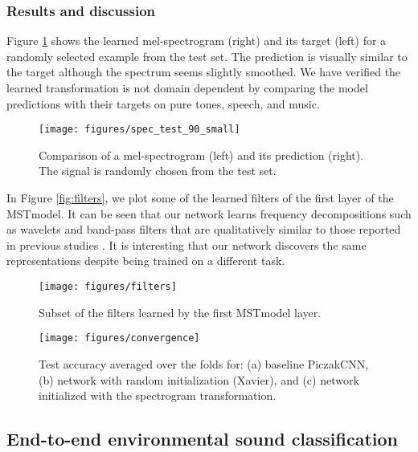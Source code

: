 \documentclass{article}
\begin{document}
\subsubsection{Results and discussion}
Figure \ref{fig:learned_spectrogram} shows the learned mel-spectrogram (right) and its target (left) for a randomly selected example from the test set. The prediction is visually similar to the target although the spectrum seems slightly smoothed. We have verified the learned transformation is not domain dependent by comparing the model predictions with their targets on pure tones, speech, and music.
\begin{figure}[h]
  \centering
  \texttt{[image: figures/spec\_test\_90\_small]}
\caption{Comparison of a mel-spectrogram (left) and its prediction (right). The signal is randomly chosen from the test set.}
  \label{fig:learned_spectrogram}
\end{figure}

In Figure \ref{fig:filters}, we plot some of the learned filters of the first layer of the MSTmodel. It can be seen that our network learns frequency decompositions such as wavelets and band-pass filters that are qualitatively similar to those reported in previous studies \cite{tuske2014acoustic}\cite{aytar2016soundnet}\cite{hoshen_speech_2015}. It is interesting that our network discovers the same representations despite being trained on a different task.

\begin{figure}[h]
\centering
\begin{minipage}{.48\textwidth}
\vspace*{-2cm}
  \centering
  \texttt{[image: figures/filters]}
  \caption{Subset of the filters learned by the first MSTmodel layer.}
  \label{fig:filters}
\end{minipage}%
\hfill
\begin{minipage}{.45\textwidth}
  \centering
  \texttt{[image: figures/convergence]}
  \caption{Test accuracy averaged over the folds for: (a) baseline PiczakCNN, (b) network with random initialization (Xavier), and (c) network initialized with the spectrogram transformation.}
  \label{fig:accuracy}
\end{minipage}
\end{figure}

\subsection{End-to-end environmental sound classification}
\end{document}
